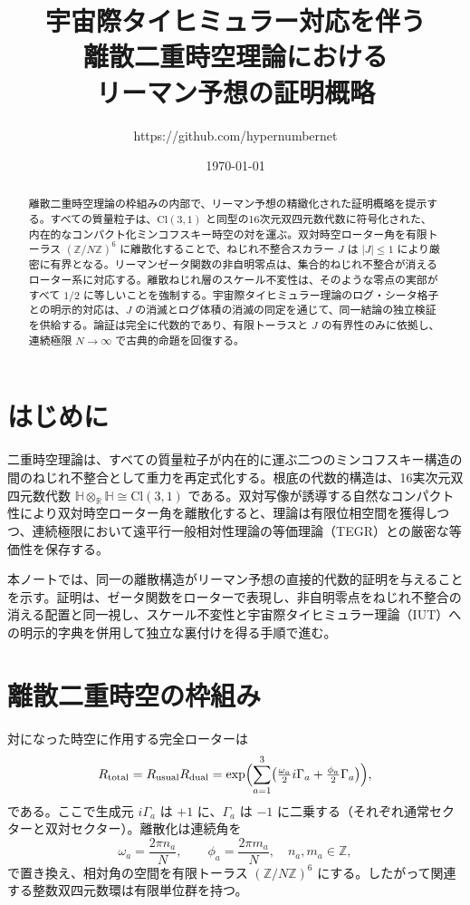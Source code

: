 \documentclass[a4paper]{article}
\title{宇宙際タイヒミュラー対応を伴う\\
離散二重時空理論における\\
リーマン予想の証明概略}
\author{https://github.com/hypernumbernet}
\date{\today}
\begin{document}
\maketitle

\begin{abstract}
離散二重時空理論の枠組みの内部で、リーマン予想の精緻化された証明概略を提示する。すべての質量粒子は、$\mathrm{Cl}(3,1)$ と同型の16次元双四元数代数に符号化された、内在的なコンパクト化ミンコフスキー時空の対を運ぶ。双対時空ローター角を有限トーラス $(\mathbb{Z}/N\mathbb{Z})^6$ に離散化することで、ねじれ不整合スカラー $J$ は $|J| \leq 1$ により厳密に有界となる。リーマンゼータ関数の非自明零点は、集合的ねじれ不整合が消えるローター系に対応する。離散ねじれ層のスケール不変性は、そのような零点の実部がすべて $1/2$ に等しいことを強制する。宇宙際タイヒミュラー理論のログ・シータ格子との明示的対応は、$J$ の消滅とログ体積の消滅の同定を通じて、同一結論の独立検証を供給する。論証は完全に代数的であり、有限トーラスと $J$ の有界性のみに依拠し、連続極限 $N \to \infty$ で古典的命題を回復する。
\end{abstract}

\section{はじめに}

二重時空理論は、すべての質量粒子が内在的に運ぶ二つのミンコフスキー構造の間のねじれ不整合として重力を再定式化する。根底の代数的構造は、16実次元双四元数代数 $\mathbb{H} \otimes_{\mathbb{R}} \mathbb{H} \cong \mathrm{Cl}(3,1)$ である。双対写像が誘導する自然なコンパクト性により双対時空ローター角を離散化すると、理論は有限位相空間を獲得しつつ、連続極限において遠平行一般相対性理論の等価理論（TEGR）との厳密な等価性を保存する。

本ノートでは、同一の離散構造がリーマン予想の直接的代数的証明を与えることを示す。証明は、ゼータ関数をローターで表現し、非自明零点をねじれ不整合の消える配置と同一視し、スケール不変性と宇宙際タイヒミュラー理論（IUT）への明示的字典を併用して独立な裏付けを得る手順で進む。

\section{離散二重時空の枠組み}

対になった時空に作用する完全ローターは
\[
R_{\rm total}=R_{\rm usual}R_{\rm dual}=\exp\Bigl(\sum_{a=1}^3\bigl(\tfrac{\omega_a}{2}i\Gamma_a+\tfrac{\phi_a}{2}\Gamma_a\bigr)\Bigr),
\]
である。ここで生成元 $i\Gamma_a$ は $+1$ に、$\Gamma_a$ は $-1$ に二乗する（それぞれ通常セクターと双対セクター）。離散化は連続角を
\[
\omega_a=\frac{2\pi n_a}{N},\qquad\phi_a=\frac{2\pi m_a}{N},\quad n_a,m_a\in\mathbb{Z},
\]
で置き換え、相対角の空間を有限トーラス $(\mathbb{Z}/N\mathbb{Z})^6$ にする。したがって関連する整数双四元数環は有限単位群を持つ。
\end{document}
